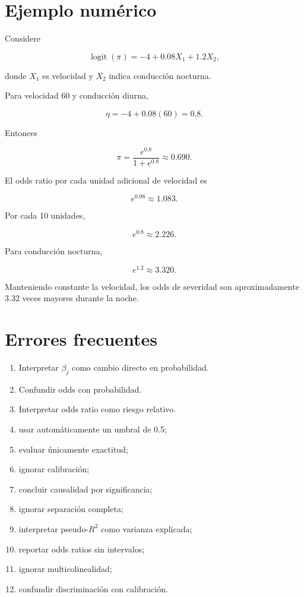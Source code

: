\documentclass[
  spanish,
  11pt,
  letterpaper,
  DIV=11,
  numbers=noendperiod]{scrreprt}
\providecommand{\tightlist}{%
  \setlength{\itemsep}{0pt}\setlength{\parskip}{0pt}}
\theoremstyle{definition}
\theoremstyle{plain}
\theoremstyle{definition}
\theoremstyle{remark}
\begin{document}
\section{Ejemplo numérico}\label{ejemplo-numuxe9rico-1}

Considere

\[
\operatorname{logit}(\pi)
=
-4+0.08X_1+1.2X_2,
\]

donde \(X_1\) es velocidad y \(X_2\) indica conducción nocturna.

Para velocidad 60 y conducción diurna,

\[
\eta=-4+0.08(60)=0.8.
\]

Entonces

\[
\pi
=
\frac{e^{0.8}}{1+e^{0.8}}
\approx 0.690.
\]

El odds ratio por cada unidad adicional de velocidad es

\[
e^{0.08}\approx1.083.
\]

Por cada 10 unidades,

\[
e^{0.8}\approx2.226.
\]

Para conducción nocturna,

\[
e^{1.2}\approx3.320.
\]

Manteniendo constante la velocidad, los odds de severidad son
aproximadamente 3.32 veces mayores durante la noche.

\section{Errores frecuentes}\label{errores-frecuentes-10}

\begin{enumerate}
\def\labelenumi{\arabic{enumi}.}
\tightlist
\item
  Interpretar \(\beta_j\) como cambio directo en probabilidad.
\item
  Confundir odds con probabilidad.
\item
  Interpretar odds ratio como riesgo relativo.
\item
  usar automáticamente un umbral de 0.5;
\item
  evaluar únicamente exactitud;
\item
  ignorar calibración;
\item
  concluir causalidad por significancia;
\item
  ignorar separación completa;
\item
  interpretar pseudo-\(R^2\) como varianza explicada;
\item
  reportar odds ratios sin intervalos;
\item
  ignorar multicolinealidad;
\item
  confundir discriminación con calibración.
\end{enumerate}
\end{document}
